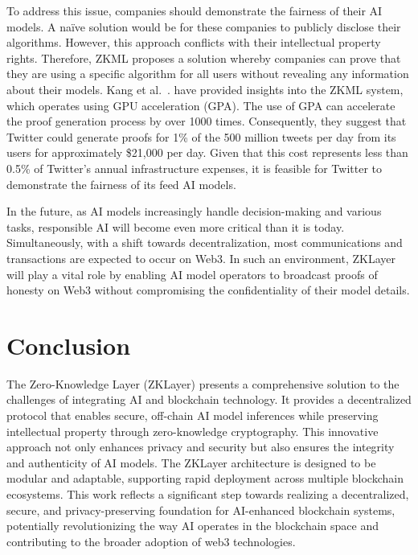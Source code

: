 \documentclass[conference]{IEEEtran}
\begin{document}


To address this issue, companies should demonstrate the fairness of their AI models. A naïve solution would be for these companies to publicly disclose their algorithms. However, this approach conflicts with their intellectual property rights. Therefore, ZKML proposes a solution whereby companies can prove that they are using a specific algorithm for all users without revealing any information about their models. Kang et al.~\cite{TensorPlonkMedium}. have provided insights into the ZKML system, which operates using GPU acceleration (GPA). The use of GPA can accelerate the proof generation process by over 1000 times. Consequently, they suggest that Twitter could generate proofs for 1\% of the 500 million tweets per day from its users for approximately \$21,000 per day. Given that this cost represents less than 0.5\% of Twitter's annual infrastructure expenses, it is feasible for Twitter to demonstrate the fairness of its feed AI models.

In the future, as AI models increasingly handle decision-making and various tasks, responsible AI will become even more critical than it is today. Simultaneously, with a shift towards decentralization, most communications and transactions are expected to occur on Web3. In such an environment, ZKLayer will play a vital role by enabling AI model operators to broadcast proofs of honesty on Web3 without compromising the confidentiality of their model details.

\section{Conclusion}
The Zero-Knowledge Layer (ZKLayer) presents a comprehensive solution to the challenges of integrating AI and blockchain technology. It provides a decentralized protocol that enables secure, off-chain AI model inferences while preserving intellectual property through zero-knowledge cryptography. This innovative approach not only enhances privacy and security but also ensures the integrity and authenticity of AI models. The ZKLayer architecture is designed to be modular and adaptable, supporting rapid deployment across multiple blockchain ecosystems. This work reﬂects a signiﬁcant step towards realizing a decentralized, secure, and privacy-preserving foundation for AI-enhanced blockchain systems, potentially revolutionizing the way AI operates in the blockchain space and contributing to the broader adoption of web3 technologies.
\end{document}
